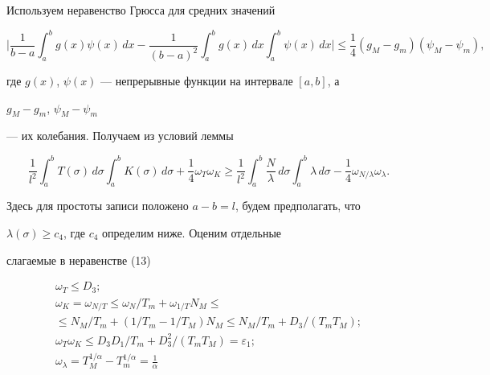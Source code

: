 \begin{pf} 


Используем неравенство Грюсса для средних значений 


$$ 


\bigg|\frac{1}{b-a}\int^b_a g(x)\psi(x)\,dx- 


\frac{1}{(b-a)^2}\int^b_a g(x)\,dx 


\int^b_a\psi(x)\,dx\bigg|\le\frac{1}{4} 


(g_M-g_m)(\psi_M-\psi_m), 


$$ 


где $g(x)$, $\psi(x)$ --- непрерывные функции на интервале $[a,b]$, а 


$g_M-g_m$, $\psi_M-\psi_m$ 


--- их колебания. Получаем из условий леммы


\begin{equation} 


\frac{1}{l^2}\int^b_a T(\sigma)\,d\sigma 


\int^b_a K(\sigma)\,d\sigma+\frac{1}{4} 


\omega_T\omega_K\ge\frac{1}{l^2}\int^b_a 


\frac{N}{\lambda}\,d\sigma\int^b_a\lambda\,d\sigma- 


\frac{1}{4}\omega_{N/\lambda}\omega_\lambda. 


\end{equation} 


Здесь для простоты записи положено $a-b=l$, будем предполагать, что 


$\lambda(\sigma)\ge c_4$, где $c_4$ определим ниже. Оценим отдельные 


слагаемые в неравенстве (13) 


\begin{equation}


\begin{array}{c}


\omega_T\le D_3;\\ 


\omega_K=\omega_{N/T}\le \omega_N/T_m+\omega_{1/T}N_M \le\\ 


\le N_M/T_m+(1/T_m-1/T_M)N_M\le N_M/T_m+D_3/(T_m T_M);\\ 


\omega_T\omega_K\le D_3D_1/T_m+D^2_3/(T_m T_M)=\varepsilon_1;\\ 


\omega_\lambda=T^{1/\alpha}_M-T^{1/\alpha}_m=\frac{1}{\alpha} 



\end{array}
\end{equation}
\end{pf}

